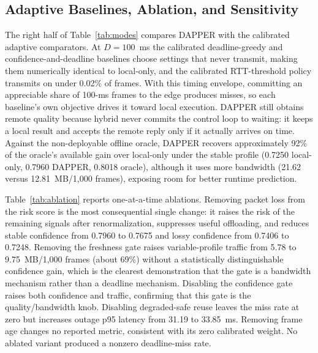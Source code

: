 \documentclass[conference,a4paper]{IEEEtran}
\begin{document}
\subsection{Adaptive Baselines, Ablation, and Sensitivity}
The right half of Table~\ref{tab:modes} compares DAPPER with the calibrated adaptive comparators. At $D=100$~ms the calibrated deadline-greedy and confidence-and-deadline baselines choose settings that never transmit, making them numerically identical to local-only, and the calibrated RTT-threshold policy transmits on under 0.02\% of frames. With this timing envelope, committing an appreciable share of 100-ms frames to the edge produces misses, so each baseline's own objective drives it toward local execution. DAPPER still obtains remote quality because hybrid never commits the control loop to waiting: it keeps a local result and accepts the remote reply only if it actually arrives on time. Against the non-deployable offline oracle, DAPPER recovers approximately 92\% of the oracle's available gain over local-only under the stable profile (0.7250 local-only, 0.7960 DAPPER, 0.8018 oracle), although it uses more bandwidth (21.62 versus 12.81~MB/1,000 frames), exposing room for better runtime prediction.

Table~\ref{tab:ablation} reports one-at-a-time ablations. Removing packet loss from the risk score is the most consequential single change: it raises the risk of the remaining signals after renormalization, suppresses useful offloading, and reduces stable confidence from 0.7960 to 0.7675 and lossy confidence from 0.7406 to 0.7248. Removing the freshness gate raises variable-profile traffic from 5.78 to 9.75~MB/1,000 frames (about 69\%) without a statistically distinguishable confidence gain, which is the clearest demonstration that the gate is a bandwidth mechanism rather than a deadline mechanism. Disabling the confidence gate raises both confidence and traffic, confirming that this gate is the quality/bandwidth knob. Disabling degraded-safe reuse leaves the miss rate at zero but increases outage p95 latency from 31.19 to 33.85~ms. Removing frame age changes no reported metric, consistent with its zero calibrated weight. No ablated variant produced a nonzero deadline-miss rate.
\end{document}
